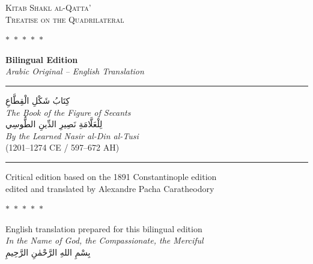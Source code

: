 \documentclass[11pt,a4paper]{article}
\theoremstyle{plain}
\theoremstyle{definition}
\theoremstyle{remark}
\newcommand{\shortline}{\noindent\rule{0.5\textwidth}{0.4pt}\par}
\newcommand{\ar}[1]{{\arabicfont\beginR #1\endR}}
\newcommand{\dblornament}{\begin{center}\textcolor{goldaccent}{$\ast$~$\ast$~$\ast$~$\ast$~$\ast$}\end{center}}
\begin{document}
\thispagestyle{empty}
\begin{center}
\vspace*{1.5cm}

{\fontsize{24}{30}\selectfont\textsc{Kitab Shakl al-Qatta'}}\\[0.5cm]
{\fontsize{18}{22}\selectfont\textsc{Treatise on the Quadrilateral}}\\[0.8cm]

\dblornament

\vspace{0.5cm}

{\Large\textbf{Bilingual Edition}}\\[0.3cm]
{\large\textit{Arabic Original -- English Translation}}\\[1cm]

\shortline

\vspace{0.5cm}

\ar{\LARGE كِتَابُ شَكْلِ الْقِطَّاعِ}\\[0.3cm]
{\large\textit{The Book of the Figure of Secants}}\\[0.8cm]

\ar{\large لِلْعَلَّامَةِ نَصِيرِ الدِّينِ الطُّوسِي}\\[0.2cm]
{\textit{By the Learned Nasir al-Din al-Tusi}}\\[0.3cm]
{\small (1201--1274 CE / 597--672 AH)}\\[1cm]

\shortline

\vspace{0.5cm}

{\small Critical edition based on the 1891 Constantinople edition}\\
{\small edited and translated by Alexandre Pacha Caratheodory}\\[0.5cm]

\dblornament

\vspace{0.5cm}

{\small English translation prepared for this bilingual edition}\\[0.3cm]

{\small\textit{In the Name of God, the Compassionate, the Merciful}}\\
{\small\ar{بِسْمِ اللهِ الرَّحْمٰنِ الرَّحِيمِ}}\\

\end{center}
\clearpage
\end{document}
